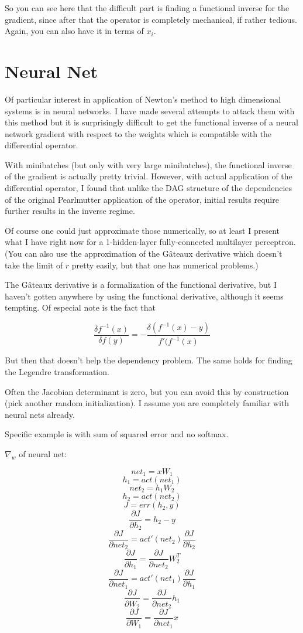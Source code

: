 \documentclass{article}
\begin{document}
So you can see here that the difficult part is finding a functional inverse for the gradient, since after that the operator is completely mechanical, if rather tedious. Again, you can also have it in terms of $x_i$.

\section{Neural Net}

Of particular interest in application of Newton's method to high dimensional systems is in neural networks. I have made several attempts to attack them with this method but it is surprisingly difficult to get the functional inverse of a neural network gradient with respect to the weights which is compatible with the differential operator.

With minibatches (but only with very large minibatches), the functional inverse of the gradient is actually pretty trivial. However, with actual application of the differential operator, I found that unlike the DAG structure of the dependencies of the original Pearlmutter application of the operator, initial results require further results in the inverse regime.

Of course one could just approximate those numerically, so at least I present what I have right now for a 1-hidden-layer fully-connected multilayer perceptron. (You can also use the approximation of the G\^{a}teaux derivative which doesn't take the limit of $r$ pretty easily, but that one has numerical problems.)

The G\^{a}teaux derivative is a formalization of the functional derivative, but I haven't gotten anywhere by using the functional derivative, although it seems tempting. Of especial note is the fact that

$$\frac{\delta f^{-1}(x)}{\delta f(y)} = - \frac{\delta(f^{-1}(x) - y)}{f'(f^{-1}(x)} $$

But then that doesn't help the dependency problem. The same holds for finding the Legendre transformation.

Often the Jacobian determinant is zero, but you can avoid this by construction (pick another random initialization). I assume you are completely familiar with neural nets already\cite{deeplearning}.

Specific example is with sum of squared error and no softmax.

$\nabla_w$ of neural net:

$$ net_1 = xW_1 $$
$$ h_1 = act(net_1) $$
$$ net_2 = h_1W_2 $$
$$ h_2 = act(net_2) $$
$$ J = err(h_2, y) $$
$$ \frac{\partial J}{\partial h_2} = h_2 - y $$
$$ \frac{\partial J}{\partial net_2} = act'(net_2)\frac{\partial J}{\partial h_2}$$
$$ \frac{\partial J}{\partial h_1} = \frac{\partial J}{\partial net_2} W_2^T$$
$$ \frac{\partial J}{\partial net_1} = act'(net_1)\frac{\partial J}{\partial h_1}$$
$$ \frac{\partial J}{\partial W_2} = \frac{\partial J}{\partial net_2} h_1$$
$$ \frac{\partial J}{\partial W_1} = \frac{\partial J}{\partial net_1} x$$
\end{document}
